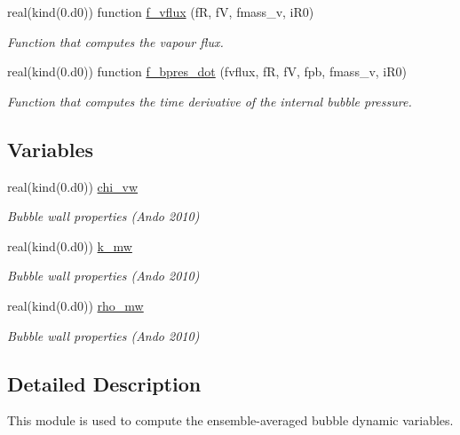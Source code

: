 \begin{DoxyCompactItemize}
real(kind(0.d0)) function \hyperlink{namespacem__bubbles_ac487d49429a9af0456e14bedbadd0ef0}{f\+\_\+vflux} (fR, fV, fmass\+\_\+v, i\+R0)
\begin{DoxyCompactList}\small\item\em Function that computes the vapour flux. \end{DoxyCompactList}\item 
real(kind(0.d0)) function \hyperlink{namespacem__bubbles_a8d0c865e6ff2c884cb6b4147d7b58491}{f\+\_\+bpres\+\_\+dot} (fvflux, fR, fV, fpb, fmass\+\_\+v, i\+R0)
\begin{DoxyCompactList}\small\item\em Function that computes the time derivative of the internal bubble pressure. \end{DoxyCompactList}\end{DoxyCompactItemize}
\subsection*{Variables}
\begin{DoxyCompactItemize}
\item 
real(kind(0.d0)) \hyperlink{namespacem__bubbles_afaab8f73b4f1cc413ad9ee2c2d32512a}{chi\+\_\+vw}
\begin{DoxyCompactList}\small\item\em Bubble wall properties (Ando 2010) \end{DoxyCompactList}\item 
real(kind(0.d0)) \hyperlink{namespacem__bubbles_a1ffd14079710afb89dad86916cbb91fc}{k\+\_\+mw}
\begin{DoxyCompactList}\small\item\em Bubble wall properties (Ando 2010) \end{DoxyCompactList}\item 
real(kind(0.d0)) \hyperlink{namespacem__bubbles_adeca2bd43645a6f7bcd59c88151eb3bc}{rho\+\_\+mw}
\begin{DoxyCompactList}\small\item\em Bubble wall properties (Ando 2010) \end{DoxyCompactList}\end{DoxyCompactItemize}


\subsection{Detailed Description}
This module is used to compute the ensemble-\/averaged bubble dynamic variables. 

